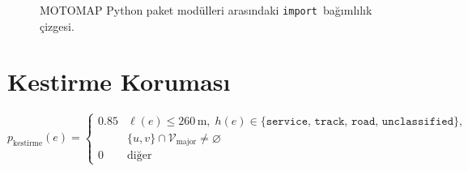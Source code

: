 \documentclass[11pt,a4paper]{article}
\newcommand{\VV}{\mathcal{V}}
\theoremstyle{definition}
\begin{document}
\begin{figure}[H]
\centering
{}
\caption{MOTOMAP Python paket mod\"ulleri aras{\i}ndaki
         \texttt{import}~ba\u{g}{\i}ml{\i}l{\i}k \c{c}izgesi.}
\label{fig:dep-graph}
\end{figure}

\section{Kestirme Korumas{\i}}\label{sec:shortcut}

\begin{equation}\label{eq:shortcut}
  p_{\text{kestirme}}(e) =
  \begin{cases}
    0.85 & \ell(e) \le 260\,\text{m},\;
           h(e) \in \{\texttt{service, track, road, unclassified}\},\\
         & \{u,v\} \cap \VV_{\text{major}} \ne \varnothing \\[4pt]
    0    & \text{di\u{g}er}
  \end{cases}
\end{equation}
\end{document}
